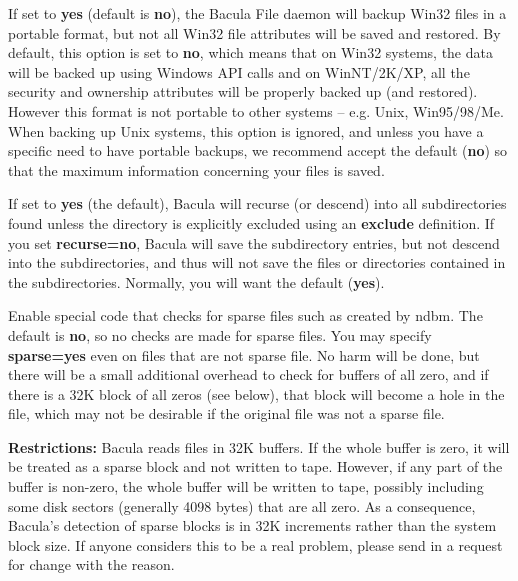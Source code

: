 \begin{description}
\label{portable}
\item [portable=yes\vb{}no]
   If set to {\bf yes} (default is {\bf no}), the Bacula File daemon will
   backup Win32 files in a portable format, but not all Win32 file
   attributes will be saved and restored.  By default, this option is set
   to {\bf no}, which means that on Win32 systems, the data will be backed
   up using Windows API calls and on WinNT/2K/XP, all the security and
   ownership attributes will be properly backed up (and restored).  However
   this format is not portable to other systems -- e.g.  Unix, Win95/98/Me.
   When backing up Unix systems, this option is ignored, and unless you
   have a specific need to have portable backups, we recommend accept the
   default ({\bf no}) so that the maximum information concerning your files
   is saved.

\item [recurse=yes\vb{}no]
   If set to {\bf yes} (the default), Bacula will recurse (or descend) into
   all subdirectories found unless the directory is explicitly excluded
   using an {\bf exclude} definition.  If you set {\bf recurse=no}, Bacula
   will save the subdirectory entries, but not descend into the
   subdirectories, and thus will not save the files or directories
   contained in the subdirectories.  Normally, you will want the default
   ({\bf yes}).

\item [sparse=yes\vb{}no]
   Enable special code that checks for sparse files such as created by
   ndbm.  The default is {\bf no}, so no checks are made for sparse files.
   You may specify {\bf sparse=yes} even on files that are not sparse file.
   No harm will be done, but there will be a small additional overhead to
   check for buffers of all zero, and if there is a 32K block of all zeros
   (see below), that block will become a hole in the file, which 
   may not be desirable if the original file was not a sparse file.

   {\bf Restrictions:} Bacula reads files in 32K buffers.  If the whole
   buffer is zero, it will be treated as a sparse block and not written to
   tape.  However, if any part of the buffer is non-zero, the whole buffer
   will be written to tape, possibly including some disk sectors (generally
   4098 bytes) that are all zero.  As a consequence, Bacula's detection of
   sparse blocks is in 32K increments rather than the system block size.
   If anyone considers this to be a real problem, please send in a request
   for change with the reason.


\end{description}
